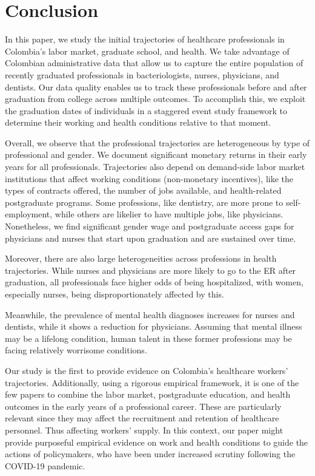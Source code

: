 \documentclass[12pt, a4paper]{article}
\begin{document}
\section{Conclusion} \label{sec:conclusion}

In this paper, we study the initial trajectories of healthcare professionals in Colombia's labor market, graduate school, and health. We take advantage of Colombian administrative data that allow us to capture the entire population of recently graduated professionals in bacteriologists, nurses, physicians, and dentists. Our data quality enables us to track these professionals before and after graduation from college across multiple outcomes. To accomplish this, we exploit the graduation dates of individuals in a staggered event study framework to determine their working and health conditions relative to that moment.

Overall, we observe that the professional trajectories are heterogeneous by type of professional and gender. We document significant monetary returns in their early years for all professionals. Trajectories also depend on demand-side labor market institutions that affect working conditions (non-monetary incentives), like the types of contracts offered, the number of jobs available, and health-related postgraduate programs. Some professions, like dentistry, are more prone to self-employment, while others are likelier to have multiple jobs, like physicians. Nonetheless, we find significant gender wage and postgraduate access gaps for physicians and nurses that start upon graduation and are sustained over time. 

Moreover, there are also large heterogeneities across professions in health trajectories. While nurses and physicians are more likely to go to the ER after graduation, all professionals face higher odds of being hospitalized, with women, especially nurses, being disproportionately affected by this. 

Meanwhile, the prevalence of mental health diagnoses increases for nurses and dentists, while it shows a reduction for physicians. Assuming that mental illness may be a lifelong condition, human talent in these former professions may be facing relatively worrisome conditions.

Our study is the first to provide evidence on Colombia's healthcare workers' trajectories. Additionally, using a rigorous empirical framework, it is one of the few papers to combine the labor market, postgraduate education, and health outcomes in the early years of a professional career. These are particularly relevant since they may affect the recruitment and retention of healthcare personnel. Thus affecting workers' supply. In this context, our paper might provide purposeful empirical evidence on work and health conditions to guide the actions of policymakers, who have been under increased scrutiny following the COVID-19 pandemic.
\end{document}
